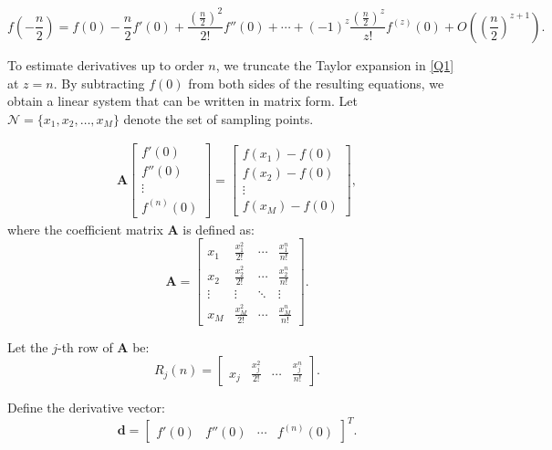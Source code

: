\documentclass{elsarticle}
\begin{document}
\begin{equation}\label{Q6}
	f\left(-\frac{n}{2}\right) = f(0) - \frac{n}{2} f'(0) + \frac{\left(\frac{n}{2}\right)^2}{2!} f''(0) + \cdots + (-1)^z \frac{\left(\frac{n}{2}\right)^z}{z!} f^{(z)}(0) + O\left(\left(\frac{n}{2}\right)^{z+1}\right).
\end{equation}

To estimate derivatives up to order $n$, we truncate the Taylor expansion in \eqref{Q1} at $z = n$. By subtracting $f(0)$ from both sides of the resulting equations, we obtain a linear system that can be written in matrix form. Let $\mathcal{N} = \{x_1, x_2, \dots, x_M\}$ denote the set of sampling points.

\begin{equation}\label{Q9}
	\begin{aligned}
		\mathbf{A}
		\begin{bmatrix}
			f'(0) \\
			f''(0) \\
			\vdots \\
			f^{(n)}(0)
		\end{bmatrix}
		=
		\begin{bmatrix}
			f(x_1)-f(0) \\
			f(x_2)-f(0) \\
			\vdots \\
			f(x_M)-f(0)
		\end{bmatrix},
	\end{aligned}
\end{equation}
where the coefficient matrix $\mathbf{A}$ is defined as:
\[
\mathbf{A} =
\begin{bmatrix}
	x_1 & \frac{x_1^2}{2!} & \cdots & \frac{x_1^n}{n!} \\
	x_2 & \frac{x_2^2}{2!} & \cdots & \frac{x_2^n}{n!} \\
	\vdots & \vdots & \ddots & \vdots \\
	x_M & \frac{x_M^2}{2!} & \cdots & \frac{x_M^n}{n!}
\end{bmatrix}.
\]

Let the $j$-th row of $\mathbf{A}$ be:
\begin{equation}\label{Q7}
	R_j(n) = \begin{bmatrix}
		x_j & \frac{x_j^2}{2!} & \cdots & \frac{x_j^n}{n!}
	\end{bmatrix}.
\end{equation}

Define the derivative vector:
\begin{equation}
	\mathbf{d} =
	\begin{bmatrix}
		f'(0) & f''(0) & \cdots & f^{(n)}(0)
	\end{bmatrix}^T.
\end{equation}
\end{document}
